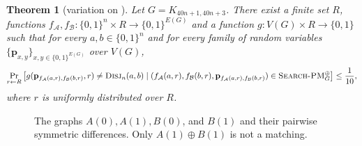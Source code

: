\documentclass[11pt]{article}
\newcommand{\scterm}[1]{{\textrm{\sc #1}}}
\newcommand{\disj}{\scterm{Disj}}
\newcommand{\xorPM}{\textsc{Search-PM}^\oplus}
\newcommand{\Alice}{\mathcal{A}}
\newcommand{\Bob}{\mathcal{B}}
\numberwithin{equation}{section}
\newtheorem{theorem}{Theorem}[section]
\begin{document}
\begin{theorem}[{variation on \protect\cite[Theorem 16]{IR21}}]
\label{th:perfect-matching-reduction}
Let $G = K_{40n+1,40n+3}$. There exist a finite set $R$, functions $f_{\Alice}, f_{\Bob}\colon \{0,1\}^n \times R \to \{0,1\}^{E(G)}$ and a function $g\colon V(G) \times R \to \{0,1\}$ such that for every $a, b \in \{0,1\}^n$ and for every family of random variables $\{\mathbf{p}_{x,y}\}_{x,y \in \{0,1\}^{E(G)}}$ over $V(G)$,
\[ \Pr_{r \gets R} \left[g(\mathbf{p}_{f_{\Alice}(a,r), f_{\Bob}(b,r)},r) \neq \disj_n(a,b) \mid (f_{\Alice}(a, r), f_{\Bob}(b, r), \mathbf{p}_{f_{\Alice}(a,r), f_{\Bob}(b,r)}) \in \xorPM_G \right] \le \frac{1}{10},\]
where $r$ is uniformly distributed over $R$.
\end{theorem}
\begin{figure}
\begin{center}
    
    \caption{The graphs $A(0), A(1), B(0)$, and $B(1)$ and their pairwise symmetric differences. Only $A(1) \oplus B(1)$ is not a matching.}
    \label{fig:xortable}
\end{center}
\end{figure}
\end{document}
